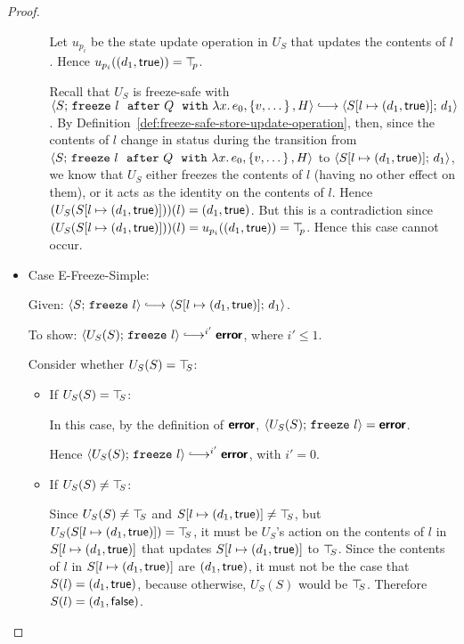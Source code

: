 \begin{proof}
\begin{itemize}
\begin{itemize}
      Let $u_{p_i}$ be the state update operation in $U_S$ that
      updates the contents of $l$.  Hence
      $u_{p_i}((d_1, \textsf{true})) = \top\hspace{-0.85mm}_{p}$.

      Recall that $U_S$ is freeze-safe with
      $\config{S}{\freezeafterfull{l}{Q}{\lam{x}{e_0}}{\setof{v,
            \dots}}{H}} \parstepsto
      \config{\extS{S}{l}{d_1}{\frozentrue}}{d_1}$.  By
      Definition~\ref{def:freeze-safe-store-update-operation}, then,
      since the contents of $l$ change in status during the transition
      from $\langle S;\, \mbox{\texttt{freeze}}~l~~{\mbox{\texttt{after}}}~Q~~{\mbox{\texttt{with}}}~\lambda x.\,e_0, \left\{v,
            \dots\right\}, H \rangle$ to
      $\langle S[l \mapsto (d_1, \textsf{true})];\, d_1 \rangle$, we know that
      $U_S$ either freezes the contents of $l$ (having no other effect
      on them), or it acts as the identity on the contents of $l$.
      Hence $(U_S(S[l \mapsto (d_1, \textsf{true})]))(l) =
      (d_1, \textsf{true})$.  But this is a contradiction since
      $(U_S(S[l \mapsto (d_1, \textsf{true})]))(l) =
      u_{p_i}((d_1, \textsf{true})) = \top\hspace{-0.85mm}_{p}$.  Hence this case
      cannot occur.
    \end{itemize}


  \item Case {\sc E-Freeze-Simple}:

    Given: $\config{S}{\freeze{l}} \parstepsto
    \config{\extS{S}{l}{d_1}{\frozentrue}}{d_1}$.

    To show: $\config{U_S(S)}{\freeze{l}} \parstepsto^{i'} \error$,
    where $i' \leq 1$.

    Consider whether $U_S(S) = \top\hspace{-0.85mm}_{S}$:
    \begin{itemize}

    \item If $U_S(S) = \top\hspace{-0.85mm}_{S}$:

      In this case, by the definition of $\textbf{\textsf{error}}$,
      $\langle U_S(S);\, \mbox{\texttt{freeze}}~l \rangle = \textbf{\textsf{error}}$.

      Hence $\config{U_S(S)}{\freeze{l}}
      \parstepsto^{i'} \error$, with $i' = 0$.

    \item If $U_S(S) \neq \top\hspace{-0.85mm}_{S}$:

      Since $U_S(S) \neq \top\hspace{-0.85mm}_{S}$ and $S[l \mapsto (d_1, \textsf{true})]
      \neq \top\hspace{-0.85mm}_{S}$, but $U_S(S[l \mapsto (d_1, \textsf{true})]) = \top\hspace{-0.85mm}_{S}$,
      it must be $U_S$'s action on the contents of $l$ in
      $S[l \mapsto (d_1, \textsf{true})]$ that updates
      $S[l \mapsto (d_1, \textsf{true})]$ to $\top\hspace{-0.85mm}_{S}$.  Since the contents
      of $l$ in $S[l \mapsto (d_1, \textsf{true})]$ are
      $(d_1, \textsf{true})$, it must not be the case that $S(l) =
      (d_1, \textsf{true})$, because otherwise, $U_S(S)$ would be
      $\top\hspace{-0.85mm}_{S}$.  Therefore $S(l) = (d_1, \textsf{false})$.


\end{itemize}
\end{itemize}
\end{proof}
